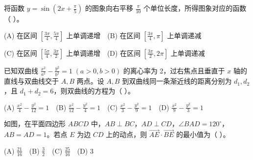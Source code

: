 \begin{question}
将函数 $y=\sin\left(2x+\frac\pi5\right)$ 的图象向右平移 $\frac\pi{10}$ 个单位长度，所得图象对应的函数（ ）。

(A) 在区间 $\left[\frac{3\pi}4,\frac{5\pi}4\right]$ 上单调递增　(B) 在区间 $\left[\frac{3\pi}4,\pi\right]$ 上单调递减

(C) 在区间 $\left[\frac{5\pi}4,\frac{3\pi}2\right]$ 上单调递增　(D) 在区间 $\left[\frac{3\pi}2,2\pi\right]$ 上单调递减

\end{question}
\begin{question}
已知双曲线 $\frac{x^2}{a^2}-\frac{y^2}{b^2}=1\;(a>0,b>0)$ 的离心率为 2，过右焦点且垂直于 $x$ 轴的直线与双曲线交于 $A,B$ 两点。设 $A,B$ 到双曲线同一条渐近线的距离分别为 $d_1,d_2$，且 $d_1+d_2=6$，则双曲线的方程为（ ）。

(A) $\frac{x^2}{4}-\frac{y^2}{12}=1$　(B) $\frac{x^2}{12}-\frac{y^2}{4}=1$　(C) $\frac{x^2}{3}-\frac{y^2}{9}=1$　(D) $\frac{x^2}{9}-\frac{y^2}{3}=1$

\Needspace{0.4\textheight}
\end{question}
\begin{question}
如图，在平面四边形 $ABCD$ 中，$AB\perp BC$，$AD\perp CD$，$\angle BAD=120^\circ$，$AB=AD=1$。若点 $E$ 为边 $CD$ 上的动点，则 $\overrightarrow{AE}\cdot\overrightarrow{BE}$ 的最小值为（ ）。
\nopagebreak[4]
\begin{center}\end{center}
\nopagebreak[4]
(A) $\frac{21}{16}$　(B) $\frac32$　(C) $\frac{25}{16}$　(D) $3$

\end{question}

